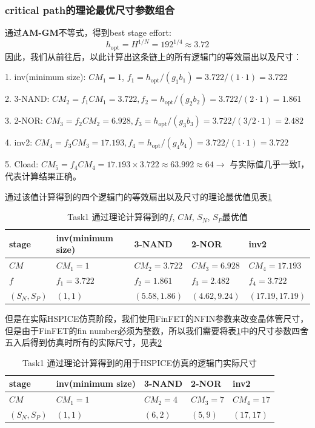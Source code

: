 \documentclass[UTF8,12pt,a4paper]{ctexart}
\begin{document}
\subsubsection{critical path的理论最优尺寸参数组合}

通过\textbf{AM-GM}不等式，得到best stage effort:
$$h_{\text{opt}} = H^{1/N} = 192^{1/4} \approx 3.72$$
因此，我们从前往后，以此计算出这条链上的所有逻辑门的等效扇出以及尺寸：

1. inv(minimum size): $CM_1 = 1$, $f_1 = h_{\text{opt}}/(g_1 b_1) = 3.722/(1 \cdot 1) = 3.722$

2. 3-NAND: $CM_2 = f_1 CM_1 = 3.722, f_2 = h_{\text{opt}}/(g_2 b_2) = 3.722/(2 \cdot 1) = 1.861$

3. 2-NOR: $CM_3 = f_2 CM_2 = 6.928, f_3 = h_{\text{opt}}/(g_3 b_3) = 3.722/(3/2 \cdot 1) = 2.482$

4. inv2: $CM_4 = f_3 CM_3 = 17.193, f_4 = h_{\text{opt}}/(g_4 b_4) = 3.722/(1 \cdot 1) = 3.722$

5. Cload: $CM_5 = f_4 CM_4 = 17.193 \times 3.722 \approx 63.992 \approx 64 \rightarrow $ 与实际值几乎一致I，代表计算结果正确。

通过该值计算得到的四个逻辑门的等效扇出以及尺寸的理论最优值见表\ref{tab:task1_theo_best_sf}
\begin{table}[htbp]
    \centering
    \caption{Task1 通过理论计算得到的$f$, $CM$, $S_N$, $S_P$最优值}
    \label{tab:task1_theo_best_sf}
    \begin{tabularx}{\linewidth}{XXXXX}
    \toprule
    stage & inv(minimum size) & 3-NAND & 2-NOR & inv2 \\
    \midrule
    $CM$ & $CM_1 = 1$ & $CM_2 = 3.722$ & $CM_3 = 6.928$ & $CM_4 = 17.193$ \\
    $f$ & $f_1 = 3.722$ & $f_2 = 1.861$ & $f_3 = 2.482$ & $f_4 = 3.722$ \\
    $(S_N, S_P)$ & $(1, 1)$ & $(5.58, 1.86)$ & $(4.62, 9.24)$ & $(17.19, 17.19)$ \\
    \bottomrule
    \end{tabularx}
\end{table}

但是在实际HSPICE仿真阶段，我们使用FinFET的NFIN参数来改变晶体管尺寸，但是由于FinFET的fin number必须为整数，所以我们需要将表\ref{tab:task1_theo_best_sf}中的尺寸参数四舍五入后得到仿真时所有的实际尺寸，见表\ref{tab:task1_theo_best_sf_spice}
\begin{table}[htbp]
    \centering
    \caption{Task1 通过理论计算得到的用于HSPICE仿真的逻辑门实际尺寸}
    \label{tab:task1_theo_best_sf_spice}
    \begin{tabularx}{\linewidth}{XXXXX}
    \toprule
    stage & inv(minimum size) & 3-NAND & 2-NOR & inv2 \\
    \midrule
    $CM$ & $CM_1 = 1$ & $CM_2 = 4$ & $CM_3 = 7$ & $CM_4 = 17$ \\
    $(S_N, S_P)$ & $(1, 1)$ & $(6, 2)$ & $(5, 9)$ & $(17, 17)$ \\
    \bottomrule
    \end{tabularx}
\end{table}
\end{document}
